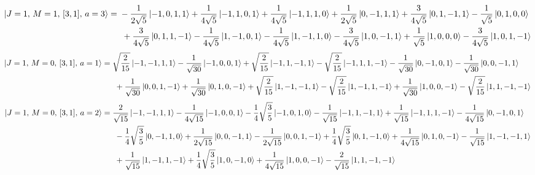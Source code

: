 \documentclass{article}
\begin{document}
{\small
\begin{equation*}
\begin{aligned}
\ket{J=1,\,M=1,\,[3,1],\,a=3} = \; &- \frac{1}{2\sqrt{5}} \ket{-1,0,1,1} + \frac{1}{4\sqrt{5}} \ket{-1,1,0,1} + \frac{1}{4\sqrt{5}} \ket{-1,1,1,0} + \frac{1}{2\sqrt{5}} \ket{0,-1,1,1} + \frac{3}{4\sqrt{5}} \ket{0,1,-1,1} - \frac{1}{\sqrt{5}} \ket{0,1,0,0} \\
  & \; + \frac{3}{4\sqrt{5}} \ket{0,1,1,-1} - \frac{1}{4\sqrt{5}} \ket{1,-1,0,1} - \frac{1}{4\sqrt{5}} \ket{1,-1,1,0} - \frac{3}{4\sqrt{5}} \ket{1,0,-1,1} + \frac{1}{\sqrt{5}} \ket{1,0,0,0} - \frac{3}{4\sqrt{5}} \ket{1,0,1,-1}
\end{aligned}
\end{equation*}}
{\small
\begin{equation*}
\begin{aligned}
\ket{J=1,\,M=0,\,[3,1],\,a=1} = \; &\sqrt{\frac{2}{15}} \ket{-1,-1,1,1} - \frac{1}{\sqrt{30}} \ket{-1,0,0,1} + \sqrt{\frac{2}{15}} \ket{-1,1,-1,1} - \sqrt{\frac{2}{15}} \ket{-1,1,1,-1} - \frac{1}{\sqrt{30}} \ket{0,-1,0,1} - \frac{1}{\sqrt{30}} \ket{0,0,-1,1} \\
  & \; + \frac{1}{\sqrt{30}} \ket{0,0,1,-1} + \frac{1}{\sqrt{30}} \ket{0,1,0,-1} + \sqrt{\frac{2}{15}} \ket{1,-1,-1,1} - \sqrt{\frac{2}{15}} \ket{1,-1,1,-1} + \frac{1}{\sqrt{30}} \ket{1,0,0,-1} - \sqrt{\frac{2}{15}} \ket{1,1,-1,-1}
\end{aligned}
\end{equation*}}
{\small
\begin{equation*}
\begin{aligned}
\ket{J=1,\,M=0,\,[3,1],\,a=2} = \; &\frac{2}{\sqrt{15}} \ket{-1,-1,1,1} - \frac{1}{4\sqrt{15}} \ket{-1,0,0,1} - \frac{1}{4}\sqrt{\frac{3}{5}} \ket{-1,0,1,0} - \frac{1}{\sqrt{15}} \ket{-1,1,-1,1} + \frac{1}{\sqrt{15}} \ket{-1,1,1,-1} - \frac{1}{4\sqrt{15}} \ket{0,-1,0,1} \\
  & \; - \frac{1}{4}\sqrt{\frac{3}{5}} \ket{0,-1,1,0} + \frac{1}{2\sqrt{15}} \ket{0,0,-1,1} - \frac{1}{2\sqrt{15}} \ket{0,0,1,-1} + \frac{1}{4}\sqrt{\frac{3}{5}} \ket{0,1,-1,0} + \frac{1}{4\sqrt{15}} \ket{0,1,0,-1} - \frac{1}{\sqrt{15}} \ket{1,-1,-1,1} \\
  & \; + \frac{1}{\sqrt{15}} \ket{1,-1,1,-1} + \frac{1}{4}\sqrt{\frac{3}{5}} \ket{1,0,-1,0} + \frac{1}{4\sqrt{15}} \ket{1,0,0,-1} - \frac{2}{\sqrt{15}} \ket{1,1,-1,-1}
\end{aligned}
\end{equation*}}
\end{document}
